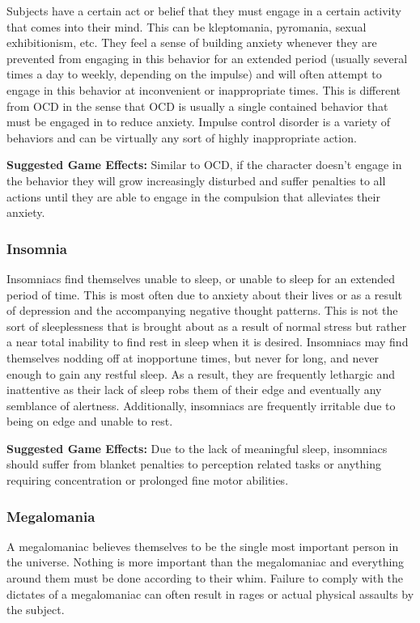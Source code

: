 Subjects have a certain act or belief that they must engage in a certain activity that comes into their mind. This can be kleptomania, pyromania, sexual exhibitionism, etc. They feel a sense of building anxiety whenever they are prevented from engaging in this behavior for an extended period (usually several times a day to weekly, depending on the impulse) and will often attempt to engage in this behavior at inconvenient or inappropriate times. This is different from OCD in the sense that OCD is usually a single contained behavior that must be engaged in to reduce anxiety. Impulse control disorder is a variety of behaviors and can be virtually any sort of highly inappropriate action. 

\textbf{Suggested Game Effects:} Similar to OCD, if the character doesn’t engage in the behavior they will grow increasingly disturbed and suffer penalties to all actions until they are able to engage in the compulsion that alleviates their anxiety. 

\subsubsection{Insomnia} 

Insomniacs find themselves unable to sleep, or unable to sleep for an extended period of time. This is most often due to anxiety about their lives or as a result of depression and the accompanying negative thought patterns. This is not the sort of sleeplessness that is brought about as a result of normal stress but rather a near total inability to find rest in sleep when it is desired. Insomniacs may find themselves nodding off at inopportune times, but never for long, and never enough to gain any restful sleep. As a result, they are frequently lethargic and inattentive as their lack of sleep robs them of their edge and eventually any semblance of alertness. Additionally, insomniacs are frequently irritable due to being on edge and unable to rest. 

\textbf{Suggested Game Effects: }Due to the lack of meaningful sleep, insomniacs should suffer from blanket penalties to perception related tasks or anything requiring concentration or prolonged fine motor abilities. 

\subsubsection{Megalomania} 

A megalomaniac believes themselves to be the single most important person in the universe. Nothing is more important than the megalomaniac and everything around them must be done according to their whim. Failure to comply with the dictates of a megalomaniac can often result in rages or actual physical assaults by the subject. 

